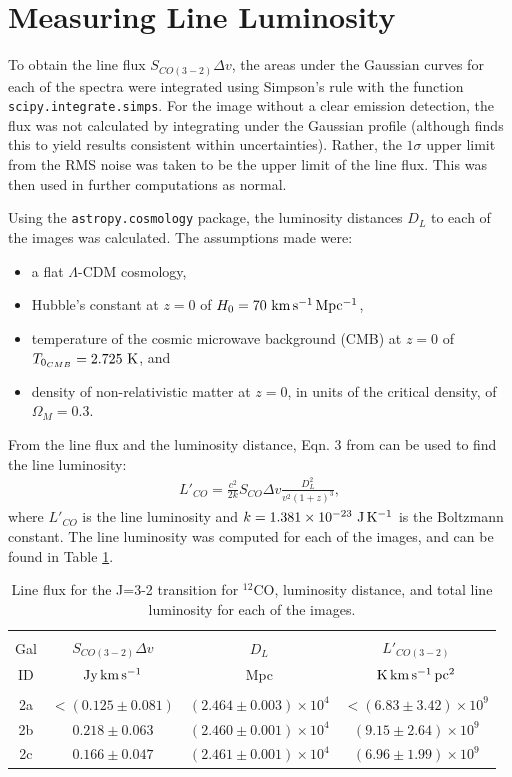 \documentclass[11pt]{article}
\newcommand{\code}{\texttt}
\begin{document}
\section*{Measuring Line Luminosity}

To obtain the line flux $S_{CO(3-2)}\Delta v$, the areas under the Gaussian curves for each of the spectra were integrated using Simpson's rule with the function \code{scipy.integrate.simps}. For the image without a clear emission detection, the flux was not calculated by integrating under the Gaussian profile (although \cite{Combes2007} finds this to yield results consistent within uncertainties). Rather, the $1\sigma$ upper limit from the RMS noise was taken to be the upper limit of the line flux. This was then used in further computations as normal. 

Using the \code{astropy.cosmology} package, the luminosity distances $D_L$ to each of the images was calculated. The assumptions made were:
\begin{itemize}
	\item a flat $\Lambda$-CDM cosmology,
	\item Hubble's constant at $z=0$ of $H_0 = 70~\rm{km\,s^{-1}\,Mpc^{-1}}$,
	\item temperature of the cosmic microwave background (CMB) at $z=0$ of $T_{0_{CMB}} = 2.725~{\rm K}$, and
	\item density of non-relativistic matter at $z=0$, in units of the critical density, of $\Omega_M = 0.3$.
\end{itemize}

From the line flux and the luminosity distance, Eqn. 3 from \cite{Solomon1992} can be used to find the line luminosity:
\begin{align}\label{eqn:linelum}
	L'_{CO} = \frac{c^2}{2k}S_{CO}\Delta v \frac{D_L^2}{v^2 (1+z)^3},
\end{align}
where $L'_{CO}$ is the line luminosity and $k = 1.381\times 10^{-23}~{\rm J\,K^{-1}}$ is the Boltzmann constant. The line luminosity was computed for each of the images, and can be found in Table \ref{table:line_lum}.

\begin{table}[!htbp]
\centering
\begin{tabular}{cccc}
\hline \\[-0.25cm]
Gal & $S_{CO(3-2)}\Delta v$ & $D_L$ & $L'_{CO(3-2)}$ \\
ID  & $\rm{Jy\,km\,s^{-1}}$ & Mpc   & $\rm{K\,km\,s^{-1}\,pc^2}$ \\[0.1cm]
\hline \\[-0.25cm]
2a & $<(0.125 \pm 0.081)$ & $(2.464 \pm 0.003)\times 10^{4}$ & $<(6.83 \pm 3.42)\times 10^{9}$ \\
2b & $0.218 \pm 0.063$ & $(2.460 \pm 0.001)\times 10^{4}$ & $(9.15 \pm 2.64)\times 10^{9}$  \\
2c & $0.166 \pm 0.047$ & $(2.461 \pm 0.001)\times 10^{4}$ & $(6.96 \pm 1.99)\times 10^{9}$  \\
\hline
\end{tabular}
\caption{Line flux for the J=3-2 transition for $^{12}$CO, luminosity distance, and total line luminosity for each of the images.}
\label{table:line_lum}
\end{table}
\end{document}
